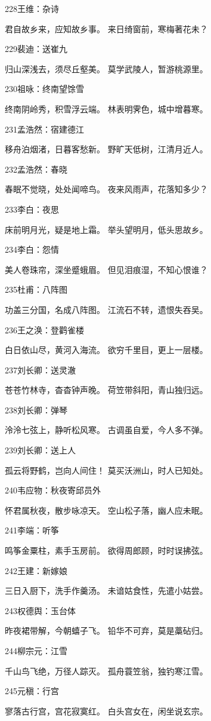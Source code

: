 228王维：杂诗

君自故乡来，应知故乡事。
来日绮窗前，寒梅著花未？

229裴迪：送崔九

归山深浅去，须尽丘壑美。
莫学武陵人，暂游桃源里。

230祖咏：终南望馀雪

终南阴岭秀，积雪浮云端。
林表明霁色，城中增暮寒。

231孟浩然：宿建德江

移舟泊烟渚，日暮客愁新。
野旷天低树，江清月近人。

232孟浩然：春晓

春眠不觉晓，处处闻啼鸟。
夜来风雨声，花落知多少？

233李白：夜思

床前明月光，疑是地上霜。
举头望明月，低头思故乡。

234李白：怨情

美人卷珠帘，深坐蹙蛾眉。
但见泪痕湿，不知心恨谁？

235杜甫：八阵图

功盖三分国，名成八阵图。
江流石不转，遗恨失吞吴。

236王之涣：登鹳雀楼

白日依山尽，黄河入海流。
欲穷千里目，更上一层楼。

237刘长卿：送灵澈

苍苍竹林寺，杳杳钟声晚。
荷笠带斜阳，青山独归远。

238刘长卿：弹琴

泠泠七弦上，静听松风寒。
古调虽自爱，今人多不弹。

239刘长卿：送上人

孤云将野鹤，岂向人间住！
莫买沃洲山，时人已知处。

240韦应物：秋夜寄邱员外

怀君属秋夜，散步咏凉天。
空山松子落，幽人应未眠。

241李端：听筝

鸣筝金粟柱，素手玉房前。
欲得周郎顾，时时误拂弦。

242王建：新嫁娘

三日入厨下，洗手作羹汤。
未谙姑食性，先遣小姑尝。

243权德舆：玉台体


昨夜裙带解，今朝蟢子飞。
铅华不可弃，莫是藁砧归。

244柳宗元：江雪

千山鸟飞绝，万径人踪灭。
孤舟蓑笠翁，独钓寒江雪。

245元稹：行宫

寥落古行宫，宫花寂寞红。
白头宫女在，闲坐说玄宗。

